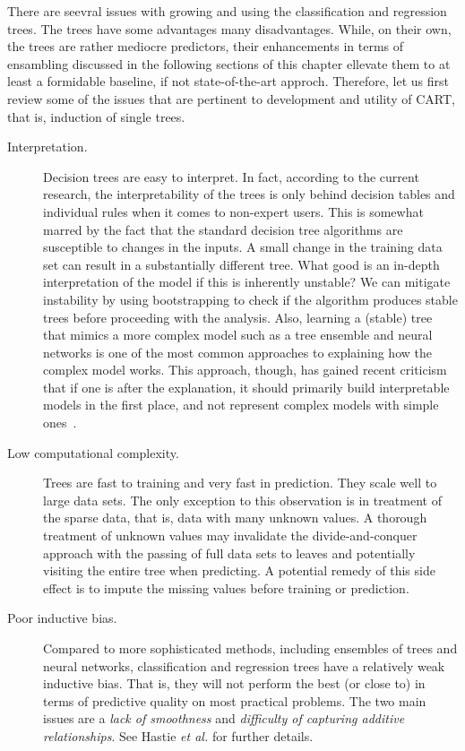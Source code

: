 \begin{refsection}
There are seevral issues with growing and using the classification and regression trees. The trees have some advantages many disadvantages. While, on their own, the trees are rather mediocre predictors, their enhancements in terms of ensambling discussed in the following sections of this chapter ellevate them to at least a formidable baseline, if not state-of-the-art approch. Therefore, let us first review some of the issues that are pertinent to development and utility of CART, that is, induction of single trees.

\begin{description}
\item[Interpretation.] Decision trees are easy to interpret. In fact, according to the current research, the interpretability of the trees is only behind decision tables and individual rules when it comes to non-expert users. This is somewhat marred by the fact that the standard decision tree algorithms are susceptible to changes in the inputs. A small change in the training data set can result in a substantially different tree. What good is an in-depth interpretation of the model if this is inherently unstable? We can mitigate instability by using bootstrapping to check if the algorithm produces stable trees before proceeding with the analysis. Also, learning a (stable) tree that mimics a more complex model such as a tree ensemble and neural networks is one of the most common approaches to explaining how the complex model works. This approach, though, has gained recent criticism that if one is after the explanation, it should primarily build interpretable models in the first place, and not represent complex models with simple ones~\cite{Rudin2019}.

\item[Low computational complexity.] Trees are fast to training and very fast in prediction. They scale well to large data sets. The only exception to this observation is in treatment of the sparse data, that is, data with many unknown values. A thorough treatment of unknown values may invalidate the divide-and-conquer approach with the passing of full data sets to leaves and potentially visiting the entire tree when predicting. A potential remedy of this side effect is to impute the missing values before training or prediction.

\item[Poor inductive bias.] Compared to more sophisticated methods, including ensembles of trees and neural networks, classification and regression trees have a relatively weak inductive bias. That is, they will not perform the best (or close to) in terms of predictive quality on most practical problems. The two main issues are a {\em lack of smoothness} and {\em difficulty of capturing additive relationships}. See Hastie {\em et al.} for further details.


\end{description}
\end{refsection}
